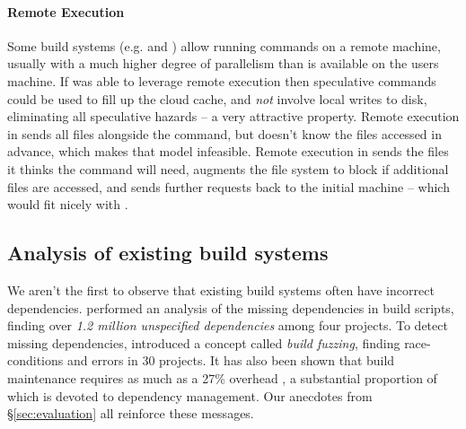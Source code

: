 \paragraph{Remote Execution} Some build systems (e.g. \Bazel and \BuildXL \cite{buildxl}) allow running commands on a remote machine, usually with a much higher degree of parallelism than is available on the users machine. If \Rattle was able to leverage remote execution then speculative commands could be used to fill up the cloud cache, and \emph{not} involve local writes to disk, eliminating all speculative hazards -- a very attractive property. Remote execution in \Bazel sends all files alongside the command, but \Rattle doesn't know the files accessed in advance, which makes that model infeasible. Remote execution in \BuildXL sends the files it thinks the command will need, augments the file system to block if additional files are accessed, and sends further requests back to the initial machine -- which would fit nicely with \Rattle.

\subsection{Analysis of existing build systems}

We aren't the first to observe that existing build systems often have incorrect dependencies.  \citet{bezemer2017empirical} performed an analysis of the missing dependencies in \Make build scripts, finding over \emph{1.2 million unspecified dependencies} among four projects. To detect missing dependencies, \citet{detecting_incorrect_build_rules} introduced a concept called \emph{build fuzzing}, finding race-conditions and errors in 30 projects. It has also been shown that build maintenance requires as much as a 27\% overhead \cite{build_maintenance}, a substantial proportion of which is devoted to dependency management. Our anecdotes from \S\ref{sec:evaluation} all reinforce these messages.


\begin{comment}
\subsection{Other related work}

The notion of hazards is used extensively in processor design. This is standard terminology.
\end{comment}
